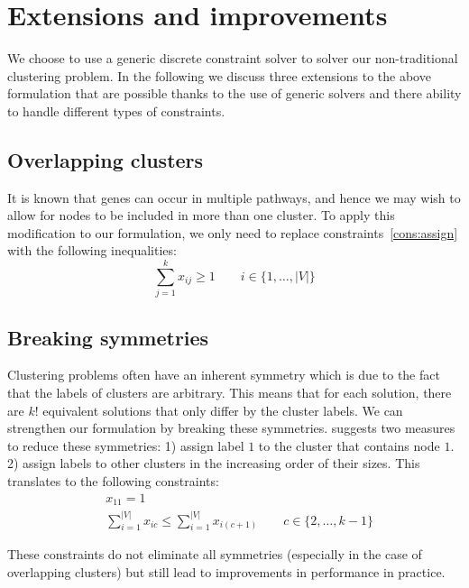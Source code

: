 \documentclass[conference]{IEEEtran}
\begin{document}
\section{Extensions and improvements}
We choose to use a generic discrete constraint solver to solver our non-traditional clustering problem. In the following we discuss three extensions to the above formulation that are possible thanks to the use of generic solvers and there ability to handle different types of constraints.


\subsection{Overlapping clusters}
It is known that genes can occur in multiple pathways, and hence we may wish to allow for nodes to be included in more than one cluster.
To apply this modification to our formulation, we only need to replace constraints~\eqref{cons:assign} with the following inequalities:
%
\begin{equation}
\sum_{j=1}^{k} x_{ij} \geq 1 \qquad i \in \{1, \ldots, |V| \}
\end{equation}
%
\subsection{Breaking symmetries}
Clustering problems often have an inherent symmetry which is due to the fact that the labels of clusters are arbitrary. This means that for each solution, there are $k!$ equivalent solutions that only differ by the cluster labels. We can strengthen our formulation by breaking these symmetries. \cite{SheraliD05a} suggests two measures to reduce these symmetries: 1) assign label $1$ to the cluster that contains node $1$. 2) assign labels to other clusters in the increasing order of their sizes. This translates to the following constraints:
%
\begin{align}
&x_{11} = 1 \\
&\sum_{i=1}^{|V|} x_{ic} \leq \sum_{i=1}^{|V|} x_{i(c+1)} \qquad c \in \{2, \ldots, k-1\}
\end{align}

These constraints do not eliminate all symmetries (especially in the case of overlapping clusters) but still lead to improvements in performance in practice. 
\end{document}
